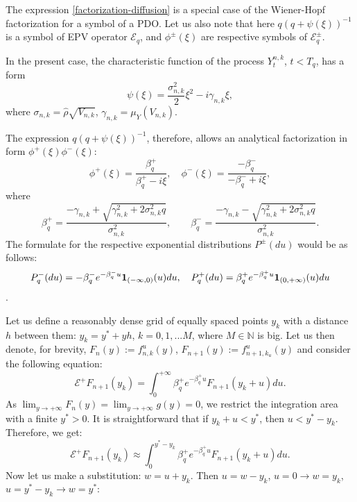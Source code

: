 \documentclass[a4paper]{jpconf}
\begin{document}
{The expression \eqref{factorization-diffusion} is a special case of the Wiener-Hopf factorization for a symbol of a PDO. Let us also note that here $q (q + \psi(\xi))^{-1}$ is a symbol of EPV operator $\mathcal{E}_q$, and  $\phi^\pm(\xi)$ are respective symbols of $\mathcal{E}^\pm_q.$

In the present case, the characteristic function of the process $Y^{n,k}_{t}$, $t < T_q$, has a form 
\begin{equation}\label{charexp-diffusional}
\psi(\xi) = \frac{\sigma_{n,k}^2}{2} \xi^2 - i \gamma_{n,k} \xi,
\end{equation}
where $\sigma_{n,k} = \hat{\rho}\sqrt{V_{n,k}}$, $\gamma_{n,k} = \mu_{Y}(V_{n,k}).$

The expression $q(q+\psi(\xi))^{-1}$, therefore, allows an analytical factorization in form $\phi^+(\xi) \phi^-(\xi)$:
\begin{equation}\label{phipm-diffusional}
\phi^+(\xi) = \frac{\beta^+_q}{\beta^+_q - i\xi}, \quad \phi^-(\xi) = \frac{-\beta^-_q}{-\beta^-_q + i\xi},
\end{equation}
where
\begin{equation}\label{betas-diffusional}
\beta^+_q = \frac{-\gamma_{n,k} + \sqrt{\gamma_{n,k}^2 + 2\sigma_{n,k}^2 q}}{\sigma_{n,k}^2}, \qquad \beta^-_q = \frac{-\gamma_{n,k} - \sqrt{\gamma_{n,k}^2 + 2\sigma_{n,k}^2 q}}{\sigma_{n,k}^2}.
\end{equation}
The formulate for the respective exponential distributions $P^\pm (du)$ would be as follows: 
$$P^-_q(du) = -\beta^-_q e^{-\beta^-_q u} {\bf 1}_{(-\infty, 0)}(u) du, \quad P^+_q(du) = \beta^+_q e^{-\beta^+_q u} {\bf 1}_{(0, +\infty)}(u) du$$.

Let us define a reasonably dense grid of equally spaced points $y_k$ with a distance $h$ between them: $y_k = y^{\ast} + yh$, $k = 0,1,...M$, where $M \in \mathbb{N}$ is big.
Let us then denote, for brevity, $F_n(y) := f^u_{n,k}(y)$, $F_{n+1}(y) := f^u_{n+1,k_u}(y)$ and consider the following equation:
\begin{equation} \label{convolution-calculation}
\mathcal{E}^+F_{n+1}(y_k) = \int_{0}^{+\infty} \beta^+_{q} e^{-\beta^+_{q}u} F_{n+1}(y_k + u)du. 
\end{equation}
As $\lim_{y\to +\infty} F_n(y) = \lim_{y\to +\infty} g(y) = 0$, we restrict the integration area with a finite $y^{\ast}>0$. It is straightforward that if $ y_k + u < y^{\ast}$, then $u < y^{\ast} - y_k.$ Therefore, we get:
$$ \mathcal{E}^+F_{n+1}(y_k) \approx \int_{0}^{y^{\ast} - y_k} \beta^+_{q} e^{-\beta^+_{q}u} F_{n+1}(y_k + u) du.$$ 
Now let us make a substitution: $w = u + y_k$. Then $u = w - y_k$, $u = 0 \rightarrow w = y_k$, $u = y^{\ast} - y_k \rightarrow w = y^{\ast}:$

}
\end{document}
